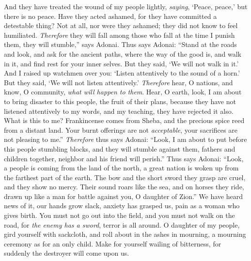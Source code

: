 \begin{biblechapter}
\verse And they have treated the wound of my people lightly, 
\textit{saying}, ‘Peace, peace,’ but there is no peace.
\verse Have they acted ashamed, for they have committed a detestable thing? 
Not at all, nor were they ashamed; they did not know to feel humiliated. 
\textit{Therefore} they will fall among those who fall at the time I punish them, 
they will stumble,” says Adonai.
\verse Thus says Adonai: “Stand at the roads and look, 
and ask for the ancient paths, where the way of the good is, 
and walk in it, and find rest for your inner selves. 
But they said, ‘We will not walk in it.’
\verse And I raised up watchmen over you: 
‘Listen attentively to the sound of a horn.’ 
But they said, ‘We will not listen attentively.’
\verse \textit{Therefore} hear, O nations, and know, O community, 
\textit{what will happen to them}.
\verse Hear, O earth, 
look, I am about to bring disaster to this people, 
the fruit of their plans, 
because they have not listened attentively to my words, 
and my teaching, they have rejected it also.
\verse What is this to me? 
Frankincense comes from Sheba, 
and the precious spice reed from a distant land. 
Your burnt offerings are not \textit{acceptable}, 
your sacrifices are not pleasing to me.”
\verse \textit{Therefore} thus says Adonai: 
“Look, I am about to put before this people stumbling blocks, 
and they will stumble against them, 
fathers and children together, 
neighbor and his friend will perish.”
\verse Thus says Adonai: 
“Look, a people is coming from the land of the north, 
a great nation is woken up from the farthest part of the earth.
\verse The bow and the short sword they grasp are cruel, 
and they show no mercy. 
Their sound roars like the sea, and on horses they ride, 
drawn up like a man for battle against you, O daughter of Zion.”
\verse We have heard news of it, 
our hands grow slack, 
anxiety has grasped us, 
pain as a woman who gives birth.
\verse You must not go out into the field, 
and you must not walk on the road, 
for \textit{the enemy has a sword}, 
terror is all around.
\verse O daughter of my people, 
gird yourself with sackcloth, 
and roll about in the ashes in mourning, 
a mourning ceremony as for an only child. 
Make for yourself wailing of bitterness, 
for suddenly the destroyer will come upon us.

\end{biblechapter}
